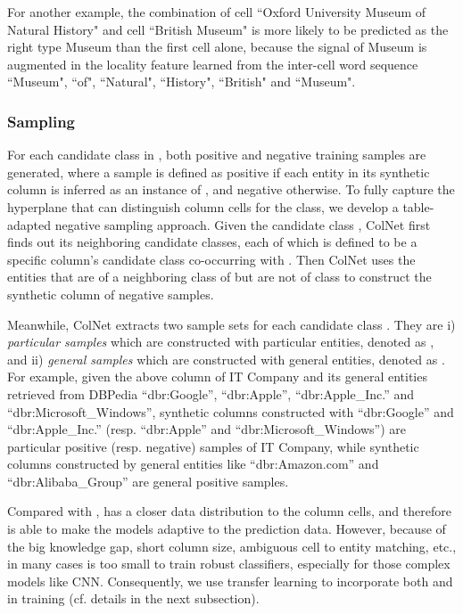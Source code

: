 \documentclass[letterpaper]{article}
\newcommand{\rv}[1]{{\color{black}#1}}
\newcommand{\camera}[1]{{\color{black}#1}}
\newcommand{\ColNet}{\textsf{ColNet}\xspace}
\begin{document}
\rv{For another example, the combination of cell ``Oxford University Museum of Natural History" and cell ``British Museum" 
is more likely to be predicted as the right type Museum than the first cell alone,
because the signal of Museum is augmented in the locality feature learned from the inter-cell word sequence ``Museum", ``of", ``Natural", ``History", ``British" and ``Museum".
}

\subsubsection{Sampling}
For each candidate class  in , 
both \rv{positive and negative training samples are generated,
where a sample is defined as positive
if each entity in its synthetic column is inferred as an instance of ,
and negative otherwise.}
To fully capture the hyperplane that can distinguish column cells for the class,
we develop a table-adapted negative sampling approach.
Given the candidate class ,
\ColNet first finds out its neighboring candidate classes, 
\rv{each of which is defined to be 
a specific column's candidate class co-occurring with .
}
Then \ColNet uses the entities that are of a neighboring class of  but are not of class  to construct the synthetic column of negative samples. 


Meanwhile, 
\ColNet extracts two sample sets for each candidate class .
They are i) \textit{particular samples} which are constructed with particular entities, denoted as ,
and ii) \textit{general samples} which are constructed with general entities, 
denoted as .
\rv{For example, given the above column of IT Company and its general entities retrieved from DBPedia ``dbr:Google'', ``dbr:Apple'', ``dbr:Apple\_Inc.'' and ``dbr:Microsoft\_Windows'',
synthetic columns constructed with ``dbr:Google'' and ``dbr:Apple\_Inc.'' (resp. ``dbr:Apple'' and ``dbr:Microsoft\_Windows'') are particular positive (resp. negative) samples of IT Company,
while synthetic columns constructed by general entities like ``dbr:Amazon.com'' and ``dbr:Alibaba\_Group'' are general positive samples.}


Compared with , 
 has a closer data distribution to the column cells,
\camera{and therefore is able to}
make the models adaptive to the prediction data.
However, because of the
big knowledge gap, short column size, ambiguous cell to entity matching, etc., 
 in many cases is too small to train robust classifiers, 
especially for those complex models like CNN.
\camera{Consequently}, we use transfer learning to incorporate both  and  in training (cf. details in the next subsection).  
\end{document}

